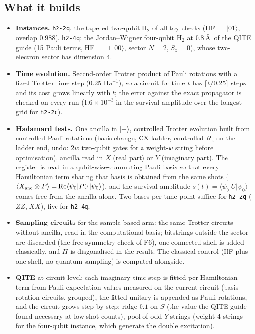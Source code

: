 \documentclass[11pt,a4paper]{article}
\newcommand{\ket}[1]{\lvert #1\rangle}
\newcommand{\bra}[1]{\langle #1\rvert}
\newcommand{\Ha}{\,\mathrm{Ha}}
\begin{document}
\subsection{What it builds}
\begin{itemize}
\item \textbf{Instances.} \texttt{h2-2q}: the tapered two-qubit H$_2$ of all toy checks (HF $=\ket{01}$, overlap $0.988$). \texttt{h2-4q}: the Jordan--Wigner four-qubit H$_2$ at $0.8$\,\AA\ of the QITE guide (15 Pauli terms, HF $=\ket{1100}$, sector $N=2$, $S_z=0$), whose two-electron sector has dimension 4.
\item \textbf{Time evolution.} Second-order Trotter product of Pauli rotations with a fixed Trotter time step ($0.25\,\Ha^{-1}$), so a circuit for time $t$ has $\lceil t/0.25\rceil$ steps and its cost grows linearly with $t$; the error against the exact propagator is checked on every run ($1.6\times10^{-3}$ in the survival amplitude over the longest grid for \texttt{h2-2q}).
\item \textbf{Hadamard tests.} One ancilla in $\ket{+}$, controlled Trotter evolution built from controlled Pauli rotations (basis change, CX ladder, controlled-$R_z$ on the ladder end, undo: $2w$ two-qubit gates for a weight-$w$ string before optimisation), ancilla read in $X$ (real part) or $Y$ (imaginary part). The register is read in a qubit-wise-commuting Pauli basis so that every Hamiltonian term sharing that basis is obtained from the same shots ($\langle X_{\rm anc}\otimes P\rangle=\operatorname{Re}\bra{\psi_0}PU\ket{\psi_0}$), and the survival amplitude $s(t)=\bra{\psi_0}U\ket{\psi_0}$ comes free from the ancilla alone. Two bases per time point suffice for \texttt{h2-2q} ($ZZ$, $XX$), five for \texttt{h2-4q}.
\item \textbf{Sampling circuits} for the sample-based arm: the same Trotter circuits without ancilla, read in the computational basis; bitstrings outside the sector are discarded (the free symmetry check of F6), one connected shell is added classically, and $H$ is diagonalised in the result. The classical control (HF plus one shell, no quantum sampling) is computed alongside.
\item \textbf{QITE} at circuit level: each imaginary-time step is fitted per Hamiltonian term from Pauli expectation values measured on the current circuit (basis-rotation circuits, grouped), the fitted unitary is appended as Pauli rotations, and the circuit grows step by step; ridge $0.1$ on $S$ (the value the QITE guide found necessary at low shot counts), pool of odd-$Y$ strings (weight-4 strings for the four-qubit instance, which generate the double excitation).

\end{itemize}
\end{document}
